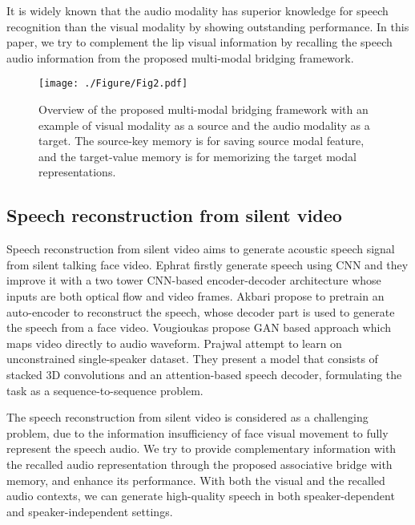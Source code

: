 \documentclass[10pt,twocolumn,letterpaper]{article}
\begin{document}
It is widely known that the audio modality has superior knowledge for speech recognition than the visual modality by showing outstanding performance. In this paper, we try to complement the lip visual information by recalling the speech audio information from the proposed multi-modal bridging framework.


\begin{figure*}[t!]
	\begin{minipage}[b]{1.0\linewidth}
		\centering
		\centerline{\texttt{[image: ./Figure/Fig2.pdf]}}
	\end{minipage}
	\vspace{-0.3cm}
	\caption{Overview of the proposed multi-modal bridging framework with an example of visual modality as a source and the audio modality as a target. The source-key memory is for saving source modal feature, and the target-value memory is for memorizing the target modal representations.}
	\label{fig:2}
	\vspace{-0.5cm}
\end{figure*}


\subsection{Speech reconstruction from silent video}
Speech reconstruction from silent video aims to generate acoustic speech signal from silent talking face video. Ephrat \etal \cite{ephrat2017vid2speech, ephrat2017improved} firstly generate speech using CNN and they improve it with a two tower CNN-based encoder-decoder architecture whose inputs are both optical flow and video frames. Akbari \etal \cite{akbari2018lip2audspec} propose to pretrain an auto-encoder to reconstruct the speech, whose decoder part is used to generate the speech from a face video. Vougioukas \etal \cite{ganbased} propose GAN based approach which maps video directly to audio waveform. Prajwal \etal \cite{l2w} attempt to learn on unconstrained single-speaker dataset. They present a model that consists of stacked 3D convolutions and an attention-based speech decoder, formulating the task as a sequence-to-sequence problem.

The speech reconstruction from silent video is considered as a challenging problem, due to the information insufficiency of face visual movement to fully represent the speech audio. We try to provide complementary information with the recalled audio representation through the proposed associative bridge with memory, and enhance its performance. With both the visual and the recalled audio contexts, we can generate high-quality speech in both speaker-dependent and speaker-independent settings.
\end{document}
